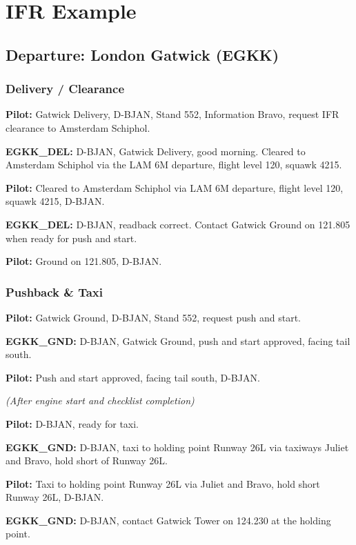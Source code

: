 \documentclass{article}
\newcommand{\callsign}{D-BJAN}
\begin{document}
\section{IFR Example}

\subsection*{Departure: London Gatwick (EGKK)}

\subsubsection*{Delivery / Clearance}

\textbf{Pilot:} Gatwick Delivery, \callsign, Stand 552, Information Bravo, request IFR clearance to Amsterdam Schiphol.

\textbf{EGKK\_DEL:} \callsign, Gatwick Delivery, good morning. Cleared to Amsterdam Schiphol via the LAM 6M departure, flight level 120, squawk 4215.

\textbf{Pilot:} Cleared to Amsterdam Schiphol via LAM 6M departure, flight level 120, squawk 4215, \callsign.

\textbf{EGKK\_DEL:} \callsign, readback correct. Contact Gatwick Ground on 121.805 when ready for push and start.

\textbf{Pilot:} Ground on 121.805, \callsign.

\subsubsection*{Pushback \& Taxi}

\textbf{Pilot:} Gatwick Ground, \callsign, Stand 552, request push and start.

\textbf{EGKK\_GND:} \callsign, Gatwick Ground, push and start approved, facing tail south.

\textbf{Pilot:} Push and start approved, facing tail south, \callsign.

\textit{(After engine start and checklist completion)}

\textbf{Pilot:} \callsign, ready for taxi.

\textbf{EGKK\_GND:} \callsign, taxi to holding point Runway 26L via taxiways Juliet and Bravo, hold short of Runway 26L.

\textbf{Pilot:} Taxi to holding point Runway 26L via Juliet and Bravo, hold short Runway 26L, \callsign.

\textbf{EGKK\_GND:} \callsign, contact Gatwick Tower on 124.230 at the holding point.
\end{document}

